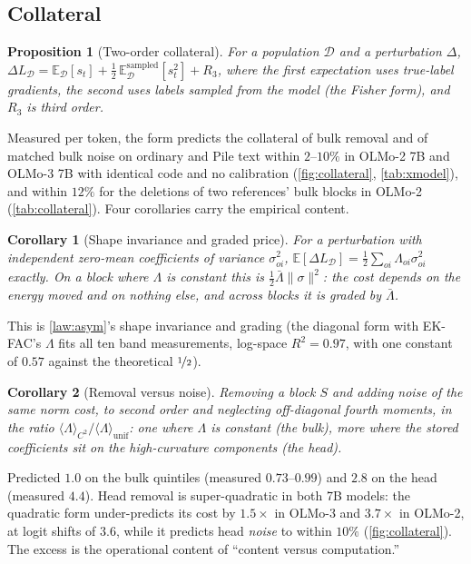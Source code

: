 \documentclass{article}
\newtheorem{proposition}{Proposition}
\newtheorem{corollary}{Corollary}
\theoremstyle{definition}\newtheorem{law}{Empirical law}
\newcommand{\E}{\mathbb{E}}
\newcommand{\D}{\mathcal{D}}
\begin{document}
\subsection{Collateral}

\begin{proposition}[Two-order collateral]\label{prop:collateral}
For a population $\D$ and a perturbation $\Delta$,
$\Delta L_\D=\E_\D[s_t]+\tfrac12\,\E^{\mathrm{sampled}}_\D[s_t^2]+R_3$,
where the first expectation uses true-label gradients, the second uses labels sampled from the model (the Fisher form), and $R_3$ is third order.
\end{proposition}
Measured per token, the form predicts the collateral of bulk removal and of matched bulk noise on ordinary and Pile text within $2$--$10\%$ in OLMo-2 7B and OLMo-3 7B with identical code and no calibration (\cref{fig:collateral}, \cref{tab:xmodel}), and within $12\%$ for the deletions of two references' bulk blocks in OLMo-2 (\cref{tab:collateral}). Four corollaries carry the empirical content.

\begin{corollary}[Shape invariance and graded price]\label{cor:shape}
For a perturbation with independent zero-mean coefficients of variance $\sigma_{oi}^2$, $\E[\Delta L_\D]=\tfrac12\sum_{oi}\Lambda_{oi}\sigma_{oi}^2$ exactly. On a block where $\Lambda$ is constant this is $\tfrac12\bar\Lambda\|\sigma\|^2$: the cost depends on the energy moved and on nothing else, and across blocks it is graded by $\bar\Lambda$.
\end{corollary}
This is \cref{law:asym}'s shape invariance and grading (the diagonal form with EK-FAC's $\Lambda$ fits all ten band measurements, log-space $R^2=0.97$, with one constant of $0.57$ against the theoretical $\nicefrac12$).

\begin{corollary}[Removal versus noise]\label{cor:ratio}
Removing a block $S$ and adding noise of the same norm cost, to second order and neglecting off-diagonal fourth moments, in the ratio $\langle\Lambda\rangle_{C^2}/\langle\Lambda\rangle_{\mathrm{unif}}$: one where $\Lambda$ is constant (the bulk), more where the stored coefficients sit on the high-curvature components (the head).
\end{corollary}
Predicted $1.0$ on the bulk quintiles (measured $0.73$--$0.99$) and $2.8$ on the head (measured $4.4$). Head removal is super-quadratic in both 7B models: the quadratic form under-predicts its cost by $1.5\times$ in OLMo-3 and $3.7\times$ in OLMo-2, at logit shifts of $3.6$, while it predicts head \emph{noise} to within $10\%$ (\cref{fig:collateral}). The excess is the operational content of ``content versus computation.''
\end{document}
